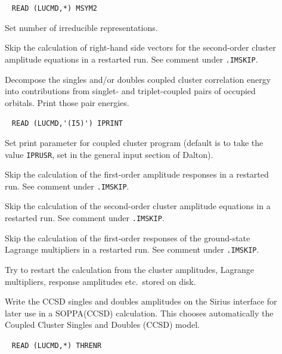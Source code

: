 \begin{description}
\item[] \verb| |\newline
       \verb|READ (LUCMD,*) MSYM2|

       Set number of irreducible representations. 
 
\item[] 
   Skip the calculation of right-hand side vectors for the 
   second-order cluster amplitude equations
   in a restarted run. See comment under \verb|.IMSKIP|.
%
%

%
%
\item[]
         Decompose the singles and/or doubles coupled cluster correlation energy
         into contributions from singlet- and triplet-coupled
         pairs of occupied orbitals. Print those pair energies.

\item[]  \verb| |\newline
\verb|READ (LUCMD,'(I5)') IPRINT|

       Set print parameter for coupled cluster program
       (default is to take the value \verb+IPRUSR+, set in the general
       input section of Dalton).
%
\item[] 
   Skip the calculation of the first-order amplitude responses
   in a restarted run. See comment under \verb|.IMSKIP|.
%
\item[] 
   Skip the calculation of the 
   second-order cluster amplitude equations
   in a restarted run. See comment under \verb|.IMSKIP|.
%
\item[] 
   Skip the calculation of the first-order responses of the 
   ground-state Lagrange multipliers in a restarted run. See comment under \verb|.IMSKIP|.
%
\item[] 
       Try to restart the calculation from the cluster amplitudes,
       Lagrange multipliers, response amplitudes etc.\ stored on
       disk.
%
\item[] 
       Write the CCSD singles and doubles amplitudes on the Sirius interface
       for later use in a SOPPA(CCSD) calculation. This
       chooses automatically the Coupled Cluster Singles and Doubles (CCSD) model.
%
\item[] \verb| |\newline
       \verb|READ (LUCMD,*) THRENR|


\end{description}

